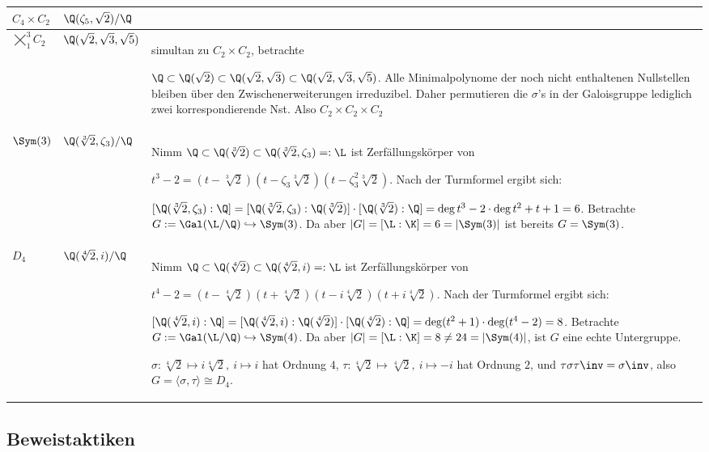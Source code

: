 \documentclass[11pt, a4paper]{article}
\begin{document}
\begin{example}
\begin{table}[H]
\begin{tabularx}{\textwidth}{|p{1.2cm}||p{2.6cm}|X|}
\hline
$C_4\times C_2$ & $\Q(\zeta_5, \sqrt2)/\Q$ & \\
\hline
$\displaystyle \bigtimes  _1 ^3 C_2$ & $\Q(\sqrt 2, \sqrt 3, \sqrt 5)$ & simultan zu $C_2\times C_2$, betrachte \par 
$\Q\subset \Q(\sqrt 2) \subset \Q(\sqrt 2,\sqrt 3) \subset \Q(\sqrt 2, \sqrt 3, \sqrt 5)$. Alle Minimalpolynome der noch nicht enthaltenen Nullstellen bleiben über den Zwischenerweiterungen irreduzibel. Daher permutieren die $\sigma$'s in der Galoisgruppe lediglich zwei korrespondierende Nst. Also $C_2\times C_2\times C_2$\\
\hline


$\Sym(3)$&$\Q(\sqrt[3]2, \zeta_3)/\Q$& Nimm $\Q\subset \Q(\sqrt[3]2)\subset \Q(\sqrt[3]{2}, \zeta_3)=:\L$ ist Zerfällungskörper von \par $t^3 -2 = (t-\sqrt[3]{2})(t-\zeta_3\sqrt[3]{2})(t-\zeta_3^2\sqrt[3]{2})$. Nach der Turmformel ergibt sich:\par
$[\Q(\sqrt[3]2, \zeta_3):\Q] = [\Q(\sqrt[3]2, \zeta_3):\Q(\sqrt[3]2)]\cdot [\Q(\sqrt[3]2):\Q]= \deg t^3 -2 \cdot \deg t^2 +t + 1 = 6$. Betrachte 
$G:=\Gal (\L/\Q)\hookrightarrow \Sym(3)$. Da aber $|G| = [\L:\K] = 6 = |\Sym(3)| $ ist bereits $G=\Sym(3)$.\\
\hline
$D_4$&$\Q(\sqrt[4]2, i)/\Q$& Nimm $\Q\subset \Q(\sqrt[4]2)\subset \Q(\sqrt[4]2,i)=:\L$ ist Zerfällungskörper von \par $t^4-2=(t-\sqrt[4]2)(t+\sqrt[4]2)(t-i\sqrt[4]2)(t+i\sqrt[4]2)$. Nach der Turmformel ergibt sich:\par
$[\Q(\sqrt[4]2,i):\Q]=[\Q(\sqrt[4]2,i):\Q(\sqrt[4]2)]\cdot[\Q(\sqrt[4]2):\Q]=\deg(t^2+1)\cdot\deg(t^4-2)=8$. Betrachte
$G:=\Gal(\L/\Q)\hookrightarrow \Sym(4)$. Da aber $|G|=[\L:\K]=8\neq24=|\Sym(4)|$, ist $G$ eine echte Untergruppe. \par
$\sigma:\sqrt[4]2\mapsto i\sqrt[4]2,\ i\mapsto i$ hat Ordnung $4$, $\tau:\sqrt[4]2\mapsto\sqrt[4]2,\ i\mapsto-i$ hat Ordnung $2$, und $\tau\sigma\tau\inv=\sigma\inv$, also $G=\langle\sigma,\tau\rangle\cong D_4$.\\
\hline
\end{tabularx}
\end{table}

\end{example}

\newpage

\subsection*{Beweistaktiken}
\end{document}
